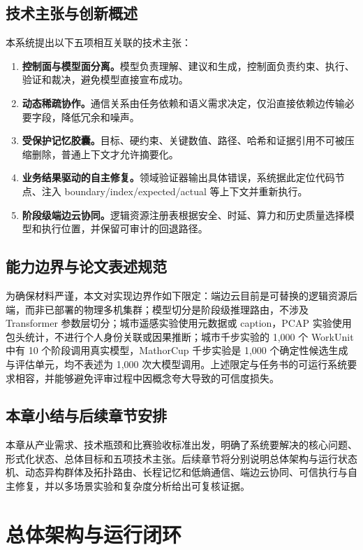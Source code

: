 \documentclass[UTF8,a4paper,12pt,oneside]{ctexbook}
\begin{document}
\section{技术主张与创新概述}
本系统提出以下五项相互关联的技术主张：
\begin{enumerate}
\item \textbf{控制面与模型面分离。}模型负责理解、建议和生成，控制面负责约束、执行、验证和裁决，避免模型直接宣布成功。
\item \textbf{动态稀疏协作。}通信关系由任务依赖和语义需求决定，仅沿直接依赖边传输必要字段，降低冗余和噪声。
\item \textbf{受保护记忆胶囊。}目标、硬约束、关键数值、路径、哈希和证据引用不可被压缩删除，普通上下文才允许摘要化。
\item \textbf{业务结果驱动的自主修复。}领域验证器输出具体错误，系统据此定位代码节点、注入 boundary/index/expected/actual 等上下文并重新执行。
\item \textbf{阶段级端边云协同。}逻辑资源注册表根据安全、时延、算力和历史质量选择模型和执行位置，并保留可审计的回退路径。
\end{enumerate}

\section{能力边界与论文表述规范}
为确保材料严谨，本文对实现边界作如下限定：端边云目前是可替换的逻辑资源后端，而非已部署的物理多机集群；模型切分是阶段级推理路由，不涉及 Transformer 参数层切分；城市遥感实验使用元数据或 caption，PCAP 实验使用包头统计，不进行个人身份关联或因果推断；城市千步实验的 1,000 个 WorkUnit 中有 10 个阶段调用真实模型，MathorCup 千步实验是 1,000 个确定性候选生成与评估单元，均不表述为 1,000 次大模型调用。上述限定与任务书的可运行系统要求相容，并能够避免评审过程中因概念夸大导致的可信度损失。

\section{本章小结与后续章节安排}
本章从产业需求、技术瓶颈和比赛验收标准出发，明确了系统要解决的核心问题、形式化状态、总体目标和五项技术主张。后续章节将分别说明总体架构与运行状态机、动态异构群体及拓扑路由、长程记忆和低熵通信、端边云协同、可信执行与自主修复，并以多场景实验和复杂度分析给出可复核证据。

\chapter{总体架构与运行闭环}
\end{document}
